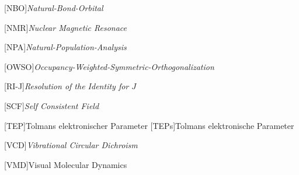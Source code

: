 \begin{acronym}[SEPSEP]
    [NBO]{\textit{Natural-Bond-Orbital}}
    
    [NMR]{\textit{Nuclear Magnetic Resonace}}
        
    [NPA]{\textit{Natural-Population-Analysis}}
    
    [OWSO]{\textit{Occupancy-Weighted-Symmetric-Orthogonalization}}
    
    [RI-J]{\textit{Resolution of the Identity for $J$}}
    
	[SCF]{\textit{Self Consistent Field}}   

	[TEP]{Tolmans elektronischer Parameter}   
		{Tolmans elektronische Parameter}
		
	[VCD]{\textit{Vibrational Circular Dichroism}}

    

        
    [VMD]{Visual Molecular Dynamics}
\end{acronym}